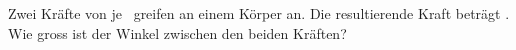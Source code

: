 Zwei Kräfte von je \FjeO\ greifen an einem Körper an. Die resultierende Kraft beträgt \FRwO. Wie gross ist der Winkel zwischen den beiden Kräften?
